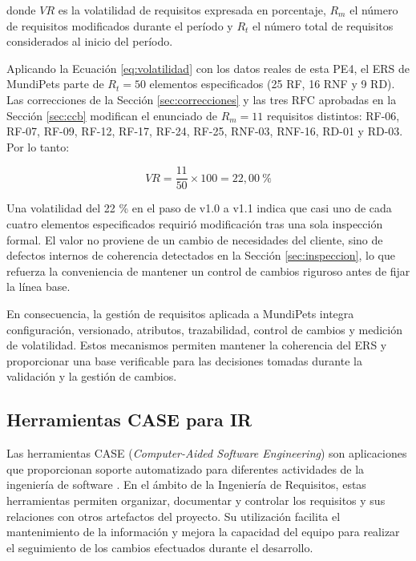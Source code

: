 \documentclass[journal,onecolumn]{IEEEtran}
\begin{document}
	\noindent donde $VR$ es la volatilidad de requisitos expresada en porcentaje, $R_m$ el número de
	requisitos modificados durante el período y $R_t$ el número total de requisitos considerados al
	inicio del período.
	
	Aplicando la Ecuación \eqref{eq:volatilidad} con los datos reales de esta PE4, el ERS de MundiPets
	parte de $R_t = 50$ elementos especificados (25 RF, 16 RNF y 9 RD). Las correcciones de la Sección
	\ref{sec:correcciones} y las tres RFC aprobadas en la Sección \ref{sec:ccb} modifican el enunciado
	de $R_m = 11$ requisitos distintos: RF-06, RF-07, RF-09, RF-12, RF-17, RF-24, RF-25, RNF-03,
	RNF-16, RD-01 y RD-03. Por lo tanto:
	
	\begin{equation*}
		VR = \frac{11}{50} \times 100 = 22{,}00~\%
	\end{equation*}
	
	Una volatilidad del 22 \% en el paso de v1.0 a v1.1 indica que casi uno de cada cuatro elementos
	especificados requirió modificación tras una sola inspección formal. El valor no proviene de un
	cambio de necesidades del cliente, sino de defectos internos de coherencia detectados en la
	Sección \ref{sec:inspeccion}, lo que refuerza la conveniencia de mantener un control de cambios
	riguroso antes de fijar la línea base.
	
	En consecuencia, la gestión de requisitos aplicada a MundiPets integra configuración, versionado,
	atributos, trazabilidad, control de cambios y medición de volatilidad. Estos mecanismos permiten
	mantener la coherencia del ERS y proporcionar una base verificable para las decisiones tomadas
	durante la validación y la gestión de cambios.
	
	\subsection{Herramientas CASE para IR}
	
	Las herramientas CASE (\emph{Computer-Aided Software Engineering}) son aplicaciones que
	proporcionan soporte automatizado para diferentes actividades de la ingeniería de software
	\cite{swebok4}. En el ámbito de la Ingeniería de Requisitos, estas herramientas permiten
	organizar, documentar y controlar los requisitos y sus relaciones con otros artefactos del
	proyecto. Su utilización facilita el mantenimiento de la información y mejora la capacidad del
	equipo para realizar el seguimiento de los cambios efectuados durante el desarrollo.
	
\end{document}
